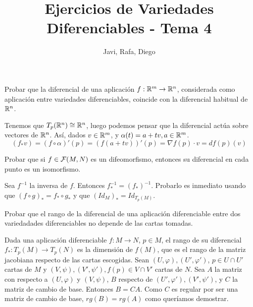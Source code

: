 \documentclass[twoside]{article}
\newcounter{ejercicio}
\begin{document}
\title{Ejercicios de Variedades Diferenciables - Tema 4}
\author{Javi, Rafa, Diego}
\maketitle

\begin{ejercicio}{1}
Probar que la diferencial de una aplicación $f : \mathbb{R}^m \to \mathbb{R}^n$, considerada
como aplicación entre variedades diferenciables, coincide con la diferencial
habitual de $\mathbb{R}^n$.
\end{ejercicio}
\begin{solucion}
Tenemos que $T_p(\mathbb{R}^n)\cong \mathbb{R}^n$, luego podemos pensar que la diferencial actúa sobre vectores de $\mathbb{R}^n$. Así, dados $v\in\mathbb{R}^m$, y $\alpha(t)=a+tv, a\in\mathbb{R}^m$. 
$$(f_*v)=(f\circ \alpha)'(p)=(f(a+tv))'(p)=\nabla f(p)\cdot v=df(p)(v)$$
\end{solucion}

\newpage

\begin{ejercicio}{2}
Probar que si $f \in \mathcal{F}(M,N)$ es un difeomorfismo, entonces su diferencial en
cada punto es un isomorfismo.
\end{ejercicio}
\begin{solucion}
Sea $f^{-1}$ la inversa de $f$. Entonces $f^{-1}_*=(f_*)^{-1}$. Probarlo es inmediato usando que $(f\circ g)_*=f_*\circ g_*$ y que $(Id_M)_*=Id_{T_p(M)}$.
\end{solucion}


\newpage

\begin{ejercicio}{3}
Probar que el rango de la diferencial de una aplicación diferenciable entre
dos variedadades diferenciables no depende de las cartas tomadas.
\end{ejercicio}
\begin{solucion}
Dada una aplicación diferenciable $f:M\to N$, $p\in M$, el rango de su diferencial $f_*:T_p(M)\to T_p(N)$ es la dimensión de $f(M)$, que es el rango de la matriz jacobiana respecto de las cartas escogidas. Sean $(U,\varphi), (U',\varphi')$, $p\in U\cap U'$ cartas de $M$ y $(V,\psi),(V',\psi'),f(p)\in V\cap V'$ cartas de $N$. Sea $A$ la matriz con respecto a $(U,\varphi)$ y $(V,\psi)$, $B$ respecto de $(U',\varphi'),(V',\psi')$, y $C$ la matriz de cambio de base. Entonces $B=CA$. Como $C$ es regular por ser una matriz de cambio de base, $rg(B)=rg(A)$ como queríamos demostrar.
\end{solucion}
\end{document}

